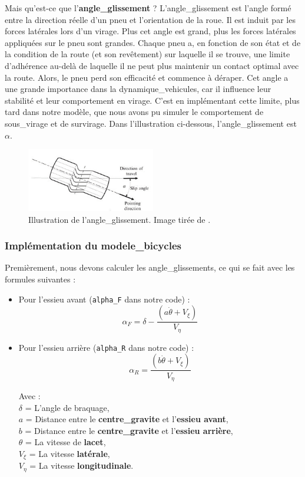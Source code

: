 Mais qu'est-ce que l'\textbf{\gls{angle_glissement}} ? L'\gls{angle_glissement} est l'angle formé entre la direction réelle d'un pneu et l'orientation de la roue.
Il est induit par les forces latérales lors d'un virage.
Plus cet angle est grand, plus les forces latérales appliquées sur le pneu sont grandes.
Chaque pneu a, en fonction de son état et de la condition de la route (et son revêtement) sur laquelle il se trouve, une limite d'adhérence au-delà de laquelle il ne peut plus maintenir un contact optimal avec la route.
Alors, le pneu perd son efficacité et commence à déraper.
Cet angle a une grande importance dans la \glspl{dynamique_vehicule}, car il influence leur stabilité et leur comportement en virage.
C'est en implémentant cette limite, plus tard dans notre modèle, que nous avons pu simuler le comportement de \gls{sous_virage} et de \gls{survirage}.
Dans l'illustration ci-dessous, l'\gls{angle_glissement} est $\alpha$.
\begin{figure}[h]
    \centering
    \includegraphics[width=0.5\textwidth]{resources/Plots/Etape2/slip-angle}
    \caption{Illustration de l'\gls{angle_glissement}. Image tirée de \cite{slip-angle}.}
    \label{fig:bicycle_model}
\end{figure}

\subsubsection{Implémentation du \glspl{modele_bicycle}}
Premièrement, nous devons calculer les \glspl{angle_glissement}, ce qui se fait avec les formules suivantes :

\begin{itemize}
    \item Pour l'\gls{essieu} avant (\texttt{alpha\_F} dans notre code) :
    $$\alpha_F = \delta - \frac{(a \dot{\theta}+V_{\xi})}{V_\eta}$$
    \item Pour l'\gls{essieu} arrière (\texttt{alpha\_R} dans notre code) :
    $$\alpha_R = \frac{(b \dot{\theta}+V_{\xi})}{V_\eta} $$

    Avec :\\
    $\delta$ = L'angle de braquage, \\
    $a$ = Distance entre le \textbf{\gls{centre_gravite}} et l'\textbf{\gls{essieu} avant},\\
    $b$ = Distance entre le \textbf{\gls{centre_gravite}} et l'\textbf{\gls{essieu} arrière},\\
    $\theta$ = La vitesse de \textbf{lacet}, \\
    $V_\xi$ = La vitesse \textbf{latérale}, \\
    $V_\eta$ = La vitesse \textbf{longitudinale}. \\
\end{itemize}

